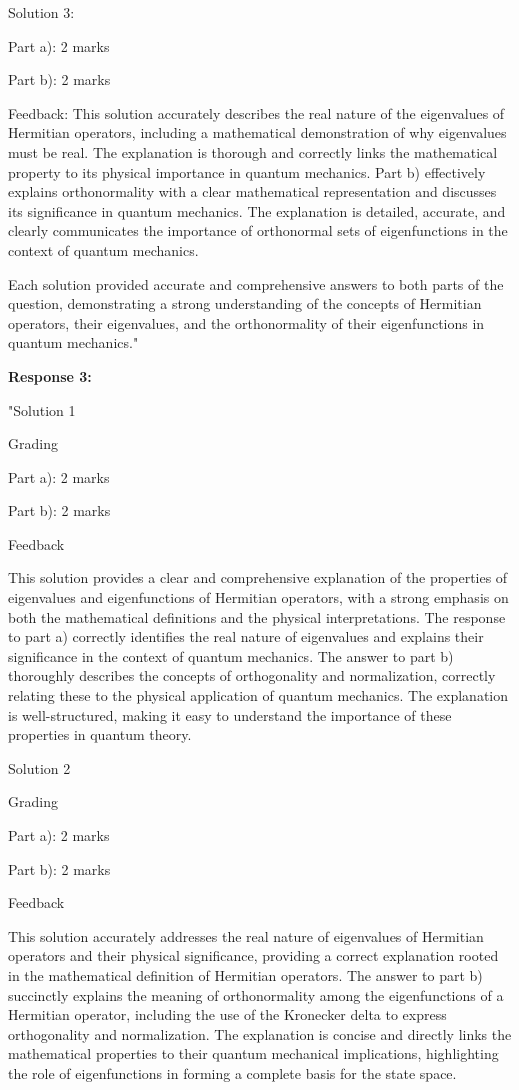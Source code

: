 \documentclass[a4paper,11pt]{article}
\begin{document}
Solution 3:

Part a): 2 marks

Part b): 2 marks

Feedback: This solution accurately describes the real nature of the eigenvalues of Hermitian operators, including a mathematical demonstration of why eigenvalues must be real. The explanation is thorough and correctly links the mathematical property to its physical importance in quantum mechanics. Part b) effectively explains orthonormality with a clear mathematical representation and discusses its significance in quantum mechanics. The explanation is detailed, accurate, and clearly communicates the importance of orthonormal sets of eigenfunctions in the context of quantum mechanics.

Each solution provided accurate and comprehensive answers to both parts of the question, demonstrating a strong understanding of the concepts of Hermitian operators, their eigenvalues, and the orthonormality of their eigenfunctions in quantum mechanics."

\textbf{Response 3:}

"Solution 1

Grading

Part a): 2 marks

Part b): 2 marks

Feedback

This solution provides a clear and comprehensive explanation of the properties of eigenvalues and eigenfunctions of Hermitian operators, with a strong emphasis on both the mathematical definitions and the physical interpretations. The response to part a) correctly identifies the real nature of eigenvalues and explains their significance in the context of quantum mechanics. The answer to part b) thoroughly describes the concepts of orthogonality and normalization, correctly relating these to the physical application of quantum mechanics. The explanation is well-structured, making it easy to understand the importance of these properties in quantum theory.

Solution 2

Grading

Part a): 2 marks

Part b): 2 marks

Feedback

This solution accurately addresses the real nature of eigenvalues of Hermitian operators and their physical significance, providing a correct explanation rooted in the mathematical definition of Hermitian operators. The answer to part b) succinctly explains the meaning of orthonormality among the eigenfunctions of a Hermitian operator, including the use of the Kronecker delta to express orthogonality and normalization. The explanation is concise and directly links the mathematical properties to their quantum mechanical implications, highlighting the role of eigenfunctions in forming a complete basis for the state space.
\end{document}
